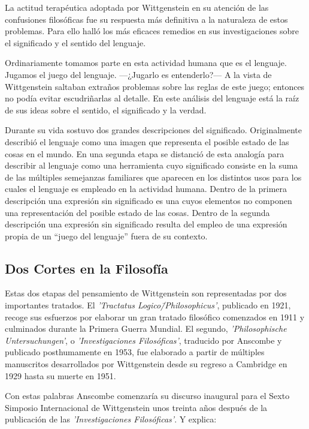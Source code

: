 La actitud terapéutica adoptada por Wittgenstein en su atención de las
confusiones filosóficas fue su respuesta más definitiva a la naturaleza de estos
problemas. Para ello halló los más eficaces remedios en sus investigaciones
sobre el significado y el sentido del lenguaje.

Ordinariamente tomamos parte en esta actividad humana que es el lenguaje.
Jugamos el juego del lenguaje. ---¿Jugarlo es entenderlo?--- A la vista de
Wittgenstein saltaban extraños problemas sobre las reglas de este juego;
entonces no podía evitar escudriñarlas al
detalle.\autocite[cf.~][loc.7099]{monk1991duty} En este análisis del lenguaje está la
raíz de sus ideas sobre el sentido, el significado y la verdad.

Durante su vida sostuvo dos grandes descripciones del significado. Originalmente
describió el lenguaje como una imagen que representa el posible estado de las
cosas en el mundo. En una segunda etapa se distanció de esta analogía para
describir al lenguaje como una herramienta cuyo significado consiste en la suma
de las múltiples semejanzas familiares que aparecen en los distintos usos para
los cuales el lenguaje es empleado en la actividad humana. Dentro de la primera
descripción una expresión sin significado es una cuyos elementos no componen una
representación del posible estado de las cosas. Dentro de la segunda descripción
una expresión sin significado resulta del empleo de una expresión propia de un
``juego del lenguaje'' fuera de su contexto.

\subsection{Dos Cortes en la Filosofía}
 Estas dos etapas del pensamiento de Wittgenstein son representadas por dos
 importantes tratados. El \emph{'Tractatus Logico\=/Philosophicus'}, publicado en
 1921, recoge sus esfuerzos por elaborar un gran tratado filosófico comenzados en
 1911 y culminados durante la Primera Guerra Mundial. El segundo,
 \emph{'Philosophische Untersuchungen'}, o \emph{'Investigaciones Filosóficas'},
 traducido por Anscombe y publicado posthumamente en 1953, fue elaborado a partir
 de múltiples manuscritos desarrollados por Wittgenstein desde su regreso a
 Cambridge en 1929 hasta su muerte en 1951.

 \autocite[p.~181]{anscombe2011plato:twocuts}
 Con estas palabras Anscombe comenzaría su discurso inaugural para el Sexto
 Simposio Internacional de Wittgenstein unos treinta años después de la
 publicación de las \emph{'Investigaciones Filosóficas'}. Y explica:
 \autocite[p.~181]{anscombe2011plato:twocuts}

